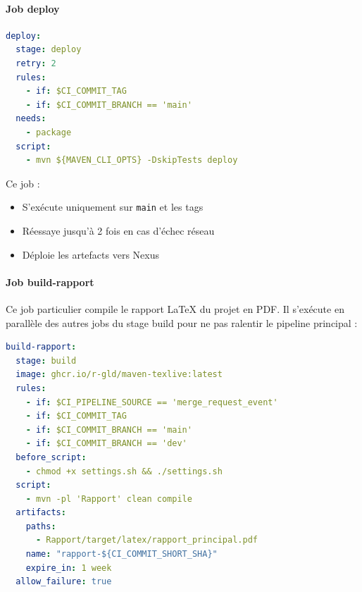 \paragraph{Job deploy}

\vspace{0.3cm}
\begin{lstlisting}[language=yaml, caption=Job de deploiement Nexus]
deploy:
  stage: deploy
  retry: 2
  rules:
    - if: $CI_COMMIT_TAG
    - if: $CI_COMMIT_BRANCH == 'main'
  needs:
    - package
  script:
    - mvn ${MAVEN_CLI_OPTS} -DskipTests deploy
\end{lstlisting}

Ce job :
\begin{itemize}
    \item S'exécute uniquement sur \texttt{main} et les tags
    \item Réessaye jusqu'à 2 fois en cas d'échec réseau
    \item Déploie les artefacts vers Nexus
\end{itemize}

\paragraph{Job build-rapport}

Ce job particulier compile le rapport LaTeX du projet en PDF. Il s'exécute en parallèle des autres jobs du stage build pour ne pas ralentir le pipeline principal :

\vspace{0.3cm}
\begin{lstlisting}[language=yaml, caption=Job de compilation du rapport PDF]
build-rapport:
  stage: build
  image: ghcr.io/r-gld/maven-texlive:latest
  rules:
    - if: $CI_PIPELINE_SOURCE == 'merge_request_event'
    - if: $CI_COMMIT_TAG
    - if: $CI_COMMIT_BRANCH == 'main'
    - if: $CI_COMMIT_BRANCH == 'dev'
  before_script:
    - chmod +x settings.sh && ./settings.sh
  script:
    - mvn -pl 'Rapport' clean compile
  artifacts:
    paths:
      - Rapport/target/latex/rapport_principal.pdf
    name: "rapport-${CI_COMMIT_SHORT_SHA}"
    expire_in: 1 week
  allow_failure: true
\end{lstlisting}

